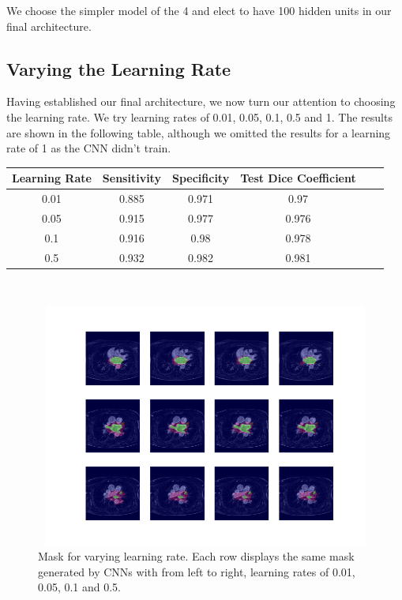\noindent We choose the simpler model of the 4 and elect to have 100 hidden units in our final architecture.\\

\subsection{Varying the Learning Rate}

\noindent Having established our final architecture, we now turn our attention to choosing the learning rate. We try learning rates of 0.01, 0.05, 0.1, 0.5 and 1. The results are shown in the following table, although we omitted the results for a learning rate of 1 as the CNN didn't train.\\

{
\centering
\begin{tabular}{cccccc}
\rowcolor[HTML]{C0C0C0} 
Learning Rate &  Sensitivity & Specificity & Test Dice Coefficient \\ \hline
\rowcolor[HTML]{FFFFFF} 
 0.01                                                 & 0.885       & 0.971       & 0.97                                                         \\
\rowcolor[HTML]{FFFFFF} 
 0.05                                                 & 0.915       & 0.977       & 0.976                                                        \\ 
\rowcolor[HTML]{FFFFFF} 
 0.1                                                  & 0.916       & 0.98        & 0.978                                                        \\
\rowcolor[HTML]{FFFFFF} 
 0.5                                                  & 0.932       & 0.982       & 0.981                                                       
\end{tabular}\\
\vspace{0.5cm}
}

\begin{figure}
\centering
\includegraphics[trim=2.5cm 1.5cm 2cm 1.5cm, clip=true, height=80mm, width=150mm]{Chapter3/mask_results_varying_learning_rate.png}
\caption{Mask for varying learning rate. Each row displays the same mask generated by CNNs with from left to right, learning rates of 0.01, 0.05, 0.1 and 0.5.}
\label{mask_results_learnin_rate}
\end{figure}


